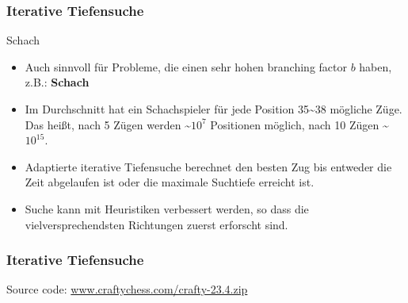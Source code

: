 \begin{frame}
	\frametitle{Iterative Tiefensuche}
	\begin{KITexampleblock}{Schach}
		\begin{itemize}
			\item Auch sinnvoll für Probleme, die einen sehr hohen branching factor $b$ haben, z.B.: \textbf{Schach}
			\item Im Durchschnitt hat ein Schachspieler für jede Position 35\textasciitilde38 mögliche Züge. Das heißt, nach 5 Zügen werden \textasciitilde$10^7$ Positionen möglich, nach 10 Zügen \textasciitilde$10^{15}$.
			\item Adaptierte iterative Tiefensuche berechnet den besten Zug bis entweder die Zeit abgelaufen ist oder die maximale Suchtiefe erreicht ist.
			\item Suche kann mit Heuristiken verbessert werden, so dass die vielversprechendsten Richtungen zuerst erforscht sind.
		\end{itemize}
	\end{KITexampleblock}
\end{frame}


\begin{frame}
	\frametitle{Iterative Tiefensuche}
	\Large Source code: \href{www.craftychess.com/crafty-23.4.zip}{www.craftychess.com/crafty-23.4.zip}
\end{frame}